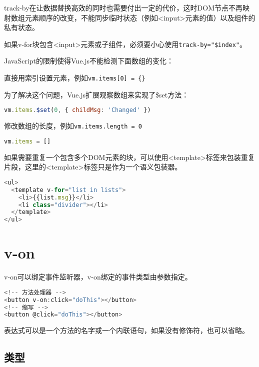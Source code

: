 track-by在让数据替换高效的同时也需要付出一定的代价，这时DOM节点不再映射数组元素顺序的改变，不能同步临时状态（例如<input>元素的值）以及组件的私有状态。


如果v-for块包含<input>元素或子组件，必须要小心使用\texttt{track-by="\$index"}。

JavaScript的限制使得Vue.js不能检测下面数组的变化：

\begin{compactitem}
\item 直接用索引设置元素，例如\texttt{vm.items[0] = \{\}}

为了解决这个问题，Vue.js扩展观察数组来实现了\$set方法：

\begin{lstlisting}[language=JavaScript]
vm.items.$set(0, { childMsg: 'Changed' })
\end{lstlisting}

\item 修改数组的长度，例如\texttt{vm.items.length = 0}

\begin{lstlisting}[language=JavaScript]
vm.items = []
\end{lstlisting}

\end{compactitem}

如果需要重复一个包含多个DOM元素的块，可以使用<template>标签来包装重复片段，这里的<template>标签只是作为一个语义包装器。

\begin{lstlisting}[language=JavaScript]
<ul>
  <template v-for="list in lists">
    <li>{{list.msg}}</li>
    <li class="divider"></li>
  </template>
</ul>
\end{lstlisting}


\chapter{v-on}

v-on可以绑定事件监听器，v-on绑定的事件类型由参数指定。




\begin{lstlisting}[language=JavaScript]
<!-- 方法处理器 -->
<button v-on:click="doThis"></button>
<!-- 缩写 -->
<button @click="doThis"></button>
\end{lstlisting}

表达式可以是一个方法的名字或一个内联语句，如果没有修饰符，也可以省略。

\section{类型}


